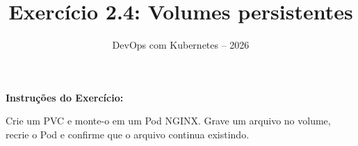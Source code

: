 \documentclass[11pt,a4paper]{article}
\title{\color{secondary}\Huge\textbf{Exercício 2.4: Volumes persistentes}}
\author{\color{primary}DevOps com Kubernetes -- 2026}
\date{}
\begin{document}
\maketitle


\textbf{Instruções do Exercício:}

\begin{tcolorbox}[colback=blue!5!white,colframe=blue!75!black]
Crie um PVC e monte-o em um Pod NGINX. Grave um arquivo no volume, recrie o Pod e confirme que o arquivo continua existindo.
\end{tcolorbox}
\end{document}
